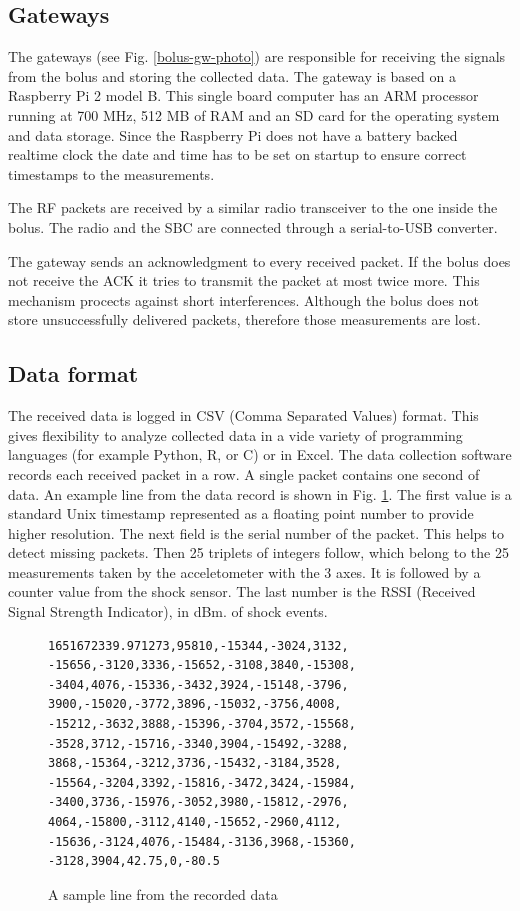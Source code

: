 \documentclass[conference]{IEEEtran}
\begin{document}
\subsection{Gateways}

The gateways (see Fig. \ref{bolus-gw-photo}) are responsible for receiving
the signals from the bolus and
storing the collected data. The gateway is based on a Raspberry Pi 2 model B.
This single board computer has an ARM processor running at 700 MHz, 512 MB of
RAM and an SD card for the operating system and data storage. Since the
Raspberry Pi does not have a battery backed realtime clock the date and
time has to be set on startup to ensure correct timestamps to the
measurements.

The RF packets are received by a similar radio transceiver to the one inside the
bolus. The radio and the SBC are connected through a serial-to-USB converter.

The gateway sends an acknowledgment to every received packet. If the bolus
does not receive the ACK it tries to transmit the packet at most twice more.
This mechanism procects against short interferences. Although the bolus does
not store unsuccessfully delivered packets, therefore those measurements are
lost.

\subsection{Data format}

The received data is logged in CSV (Comma Separated Values) format. This gives
flexibility to analyze collected data in a vide variety of programming languages
(for example Python, R, or C) or in Excel. The data collection software records
each received packet in a row. A single packet contains one second of data.
An example line from the data record is shown in Fig. \ref{csv-sample}. The first
value is a standard Unix timestamp represented as a floating point number to provide
higher resolution. The next field is the serial number of the packet. This helps to
detect missing packets. Then 25 triplets of integers follow, which belong to the
25 measurements taken by the acceletometer with the 3 axes. It is followed by
a counter value from the shock sensor. The last number is the RSSI (Received
Signal Strength Indicator), in dBm.
of shock events.

\begin{figure}[htbp]
\begin{verbatim}
1651672339.971273,95810,-15344,-3024,3132,
-15656,-3120,3336,-15652,-3108,3840,-15308,
-3404,4076,-15336,-3432,3924,-15148,-3796,
3900,-15020,-3772,3896,-15032,-3756,4008,
-15212,-3632,3888,-15396,-3704,3572,-15568,
-3528,3712,-15716,-3340,3904,-15492,-3288,
3868,-15364,-3212,3736,-15432,-3184,3528,
-15564,-3204,3392,-15816,-3472,3424,-15984,
-3400,3736,-15976,-3052,3980,-15812,-2976,
4064,-15800,-3112,4140,-15652,-2960,4112,
-15636,-3124,4076,-15484,-3136,3968,-15360,
-3128,3904,42.75,0,-80.5
\end{verbatim}
  \caption{A sample line from the recorded data}
\label{csv-sample}
\end{figure}
\end{document}
